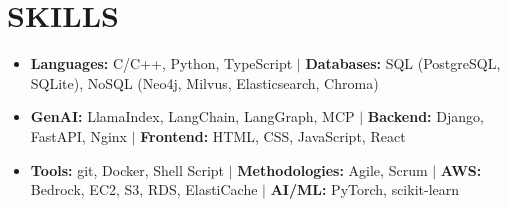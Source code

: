 \documentclass[letterpaper,11pt]{article}
\newcommand{\resumeItem}[1]{
  \item\small{#1}
}
\newcommand{\resumeItemListStart}{\begin{itemize}[label=$\vcenter{\hbox{\tiny$\bullet$}}$]}
\newcommand{\resumeItemListEnd}{\end{itemize}}
\begin{document}
\section{SKILLS}
\resumeItemListStart
\resumeItem{\textbf{Languages:} C/C++, Python, TypeScript $|$ \textbf{Databases:} SQL (PostgreSQL, SQLite), NoSQL (Neo4j, Milvus, Elasticsearch, Chroma)}
\resumeItem{\textbf{GenAI:} LlamaIndex, LangChain, LangGraph, MCP $|$ \textbf{Backend:} Django, FastAPI, Nginx $|$ \textbf{Frontend:} HTML, CSS, JavaScript, React}
\resumeItem{\textbf{Tools:} git, Docker, Shell Script $|$ \textbf{Methodologies:} Agile, Scrum $|$  \textbf{AWS:} Bedrock, EC2, S3, RDS, ElastiCache $|$ \textbf{AI/ML:} PyTorch, scikit-learn}
\resumeItemListEnd
\vspace{-40pt}
\end{document}
